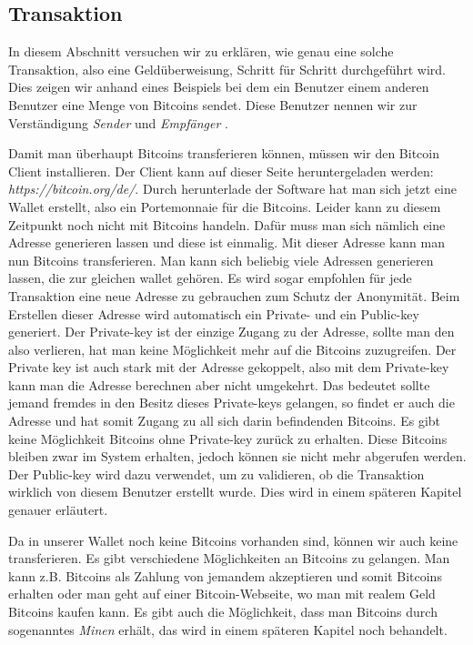 \subsection*{Transaktion}

\noindent
In diesem Abschnitt versuchen wir zu erklären, wie genau eine solche Transaktion, also eine Geldüberweisung, Schritt für Schritt durchgeführt wird.
Dies zeigen wir anhand eines Beispiels bei dem ein Benutzer einem anderen Benutzer eine Menge von Bitcoins sendet. Diese Benutzer nennen wir zur Verständigung
\emph{\dq Sender \dq} und \emph{\dq Empfänger \dq}.

\noindent
Damit man überhaupt Bitcoins transferieren können, müssen wir den Bitcoin Client installieren. Der Client kann auf dieser Seite heruntergeladen werden: \emph{\dq https://bitcoin.org/de/\dq}.
Durch herunterlade der Software hat man sich jetzt eine Wallet erstellt, also ein Portemonnaie für die Bitcoins. Leider kann zu diesem Zeitpunkt noch nicht mit Bitcoins handeln.
Dafür muss man sich nämlich eine Adresse generieren lassen und diese ist einmalig. Mit dieser Adresse kann man nun Bitcoins transferieren.
Man kann sich beliebig viele Adressen generieren lassen, die zur gleichen wallet gehören. Es wird sogar empfohlen für jede Transaktion eine neue Adresse zu gebrauchen zum Schutz der Anonymität.
Beim Erstellen dieser Adresse wird automatisch ein Private- und ein Public-key generiert. Der Private-key ist der einzige Zugang zu der Adresse, sollte man den also verlieren, hat man keine Möglichkeit mehr
auf die Bitcoins zuzugreifen. Der Private key ist auch stark mit der Adresse gekoppelt, also mit dem Private-key kann man die Adresse berechnen aber nicht umgekehrt. Das bedeutet sollte jemand fremdes in den
Besitz dieses Private-keys gelangen, so findet er auch die Adresse und hat somit Zugang zu all sich darin befindenden Bitcoins. Es gibt keine Möglichkeit Bitcoins ohne Private-key zurück zu erhalten.
Diese Bitcoins bleiben zwar im System erhalten, jedoch können sie nicht mehr abgerufen werden. Der Public-key wird dazu verwendet, um zu validieren, ob die Transaktion wirklich von diesem Benutzer
erstellt wurde. Dies wird in einem späteren Kapitel genauer erläutert.

\noindent
Da in unserer Wallet noch keine Bitcoins vorhanden sind, können wir auch keine transferieren. Es gibt verschiedene Möglichkeiten an Bitcoins zu gelangen.
Man kann z.B. Bitcoins als Zahlung von jemandem akzeptieren und somit Bitcoins erhalten oder man geht auf einer Bitcoin-Webseite, wo man mit realem Geld Bitcoins kaufen kann.
Es gibt auch die Möglichkeit, dass man Bitcoins durch sogenanntes \emph{\dq Minen \dq} erhält, das wird in einem späteren Kapitel noch behandelt.

